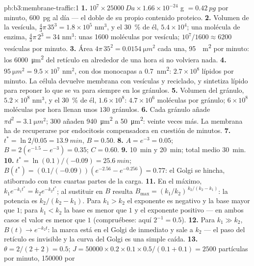 \begin{solution}{pb:b3:membrane-traffic:1}
\textbf{1.} $10^{7}\times \qty{25000}{Da}\times 1.66\times 10^{-24}$ g
$= \qty{0.42}{pg}$ por minuto, \qty{600}{pg} al día --- el doble de su
propio contenido proteico.
\textbf{2.} Volumen de la vesícula,
$\tfrac{4}{3}\pi\,35^{3} = 1.8\times 10^{5}$ nm$^{3}$, y el
\qty{30}{\%} de él, $5.4\times 10^{4}$; una
molécula de enzima, $\tfrac{4}{3}\pi\,2^{3} = 34$ nm$^{3}$: unas
\num{1600} moléculas por vesícula; $10^{7}/1600 \approx 6200$ vesículas
por minuto.
\textbf{3.} Área $4\pi\,35^{2} = \qty{0.0154}{\micro m^2}$ cada una,
\qty{95}{\micro
m^2} por minuto: los \qty{6000}{\micro m^2} del retículo en alrededor de
una hora si no volviera nada.
\textbf{4.} $\qty{95}{\micro m^2} = 9.5\times 10^{7}$ nm$^{2}$, con dos
monocapas a \qty{0.7}{nm^2}: $2.7\times 10^{8}$ lípidos por minuto. La
célula devuelve membrana con vesículas  y reciclado, y sintetiza
lípido para reponer lo que se va para siempre en los gránulos.
\textbf{5.} Volumen del gránulo, $5.2\times 10^{8}$ nm$^{3}$, y el
\qty{30}{\%} de él, $1.6\times 10^{8}$: $4.7\times 10^{6}$ moléculas por
gránulo; $6\times
10^{8}$ moléculas por hora llenan unos $130$ gránulos.
\textbf{6.} Cada gránulo añade $\pi d^{2} = \qty{3.1}{\micro m^2}$; $300$
añaden \qty{940}{\micro m^2} a \qty{50}{\micro m^2}: veinte veces más. La
membrana ha de recuperarse por endocitosis compensadora en cuestión de
minutos.
\textbf{7.} $t^{*} = \ln 2/0.05 = \qty{13.9}{min}$, $B = 0.50$.
\textbf{8.} $A = e^{-3} = 0.05$; $B = 2(e^{-1.5} - e^{-3}) = 0.35$;
$C = 0.60$.
\textbf{9.} \qty{10}{min} y \qty{20}{min}; total medio \qty{30}{min}.
\textbf{10.} $t^{*} = \ln(0.1)/(-0.09) = \qty{25.6}{min}$; $B(t^{*}) =
(0.1/(-0.09))(e^{-2.56} - e^{-0.256}) = 0.77$: el Golgi se hincha,
atiborrado con tres cuartas partes de la carga.
\textbf{11.} En el máximo, $k_{1}e^{-k_{1}t^{*}} = k_{2}e^{-k_{2}t^{*}}$;
al sustituir en $B$ resulta $B_{\max} = (k_{1}/k_{2})^{\,k_{2}/(k_{2} -
k_{1})}$: la potencia es $k_{2}/(k_{2} - k_{1})$. Para $k_{1} > k_{2}$ el
exponente es negativo y la base mayor que $1$; para $k_{1} < k_{2}$ la
base es menor que $1$ y el exponente positivo --- en ambos casos el valor
es menor que $1$ (compruébese: aquí $2^{-1} = 0.5$).
\textbf{12.} Para $k_{1} \gg k_{2}$, $B(t) \to e^{-k_{2}t}$: la marca
está en el Golgi de inmediato y sale a $k_{2}$ --- el paso del retículo
es invisible y la curva del Golgi es una simple caída.
\textbf{13.} $\theta = 2/(2+2) = 0.5$; $J = \num{50000}\times 0.2\times
0.1\times 0.5/(0.1 + 0.1) = 2500$ partículas por minuto, \num{150000} por

\end{solution}
